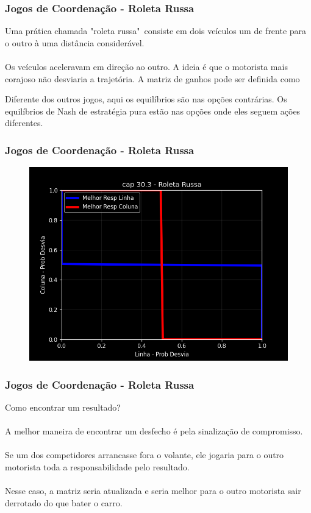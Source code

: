 \documentclass{beamer}[10]
\begin{document}
\begin{frame}
	\frametitle{Jogos de Coordenação - Roleta Russa}

	Uma prática chamada "roleta russa"\ consiste em dois veículos um de frente para o outro à uma distância considerável. 
	\\~\\
	Os veículos aceleravam em direção ao outro. A ideia é que o motorista mais corajoso não desviaria a trajetória. A matriz de ganhos pode ser definida como

	\begin{center}\usebox{\mybox}\end{center}

	Diferente dos outros jogos, aqui os equilíbrios são nas opções contrárias. Os equilíbrios de Nash de estratégia pura estão nas opções onde eles seguem ações diferentes.
	
\end{frame}

\begin{frame}
	\frametitle{Jogos de Coordenação - Roleta Russa}

	\begin{figure}[H]
		\centering
		\includegraphics[scale=0.55]{cap30_3-jogos_coordenacao_3.png}
	\end{figure}
		
\end{frame}

\begin{frame}
	\frametitle{Jogos de Coordenação - Roleta Russa}

	Como encontrar um resultado? 
	\\~\\
	A melhor maneira de encontrar um desfecho é pela sinalização de compromisso. 
	\\~\\
	Se um dos competidores arrancasse fora o volante, ele jogaria para o outro motorista toda a responsabilidade pelo resultado. 
	\\~\\
	Nesse caso, a matriz seria atualizada e seria melhor para o outro motorista sair derrotado do que bater o carro.

\end{frame}
\end{document}
